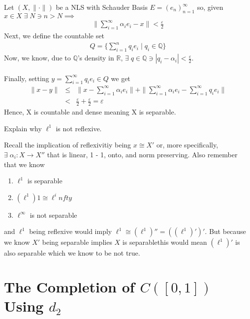 \documentclass[11pt]{SelfArxOneColBMN}
\begin{document}
\begin{solution}
Let $(X,\|\cdot\|)$ be a NLS with Schauder Basis $E = (e_n)_{n=1}^\infty$ so, given $x \in X \; \exists \; N \ni n > N \implies$
\begin{eqnarray*}
  \|\sum_{i = 1}^\infty\alpha_ie_i - x \| < \frac{\varepsilon}{2}
\end{eqnarray*}
Next, we define the countable set
\begin{eqnarray*}
  Q = \{\sum_{i = 1}^nq_ie_i \; | \; q_i \in \mathbb{Q}\}
\end{eqnarray*}
Now, we know, due to $\mathbb{Q}$'s density in $\mathbb{R}$, $\exists \; q \in \mathbb{Q} \ni |q_i - \alpha_i| < \frac{\varepsilon}{2}$.\\
\\
Finally, setting $y = \sum_{i = 1}^\infty q_ie_i \in Q$ we get
\begin{eqnarray*}
  \|x - y\| &\leq& \|x - \sum_{i = 1}^\infty \alpha_i e_i \| + \|\sum_{i = 1}^\infty \alpha_i e_i  - \sum_{i = 1}^\infty q_i e_i \|\\
  &<& \frac{\varepsilon}{2} + \frac{\varepsilon}{2} = \varepsilon
\end{eqnarray*}
Hence, X is countable and dense meaning X is separable.
\end{solution}

\begin{exercise}
Explain why $\ell^1$ is not reflexive.
\end{exercise}

\begin{solution}
Recall the implication of reflexivitiy being $x \cong X'$ or, more specifically, $\exists \; \alpha_i: X \rightarrow X''$ that is linear, 1 - 1, onto, and norm preserving. Also remember that we know
\begin{enumerate}
  \item $\ell^1$ is separable
  \item $(\ell^1)1 \cong \ell^infty$
  \item $\ell^\infty$ is not separable
\end{enumerate}
and $\ell^1$ being reflexive would imply $\ell^1 \cong (\ell^1)'' = ((\ell^1)')'$. But because we know $X'$ being separable implies $X$ is separablethis would mean $(\ell^1)'$ is also separable which we know to be not true. 
\end{solution}

\section{The Completion of $C([0,1])$ Using $d_2$}
\end{document}
